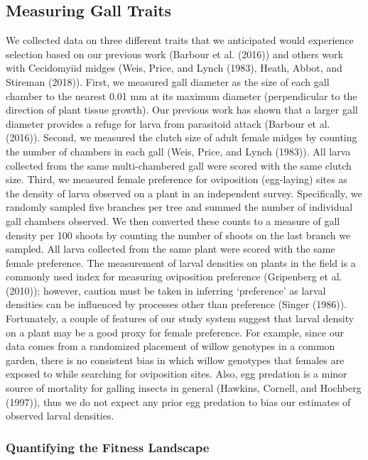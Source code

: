 \documentclass[]{elsarticle} %
\begin{document}
\subsection{Measuring Gall Traits}\label{measuring-gall-traits}

We collected data on three different traits that we anticipated would
experience selection based on our previous work (Barbour et al. (2016))
and others work with Cecidomyiid midges (Weis, Price, and Lynch (1983),
Heath, Abbot, and Stireman (2018)). First, we measured gall diameter as
the size of each gall chamber to the nearest 0.01 mm at its maximum
diameter (perpendicular to the direction of plant tissue growth). Our
previous work has shown that a larger gall diameter provides a refuge
for larva from parasitoid attack (Barbour et al. (2016)). Second, we
measured the clutch size of adult female midges by counting the number
of chambers in each gall (Weis, Price, and Lynch (1983)). All larva
collected from the same multi-chambered gall were scored with the same
clutch size. Third, we measured female preference for oviposition
(egg-laying) sites as the density of larva observed on a plant in an
independent survey. Specifically, we randomly sampled five branches per
tree and summed the number of individual gall chambers observed. We then
converted these counts to a measure of gall density per 100 shoots by
counting the number of shoots on the last branch we sampled. All larva
collected from the same plant were scored with the same female
preference. The measurement of larval densities on plants in the field
is a commonly used index for measuring oviposition preference
(Gripenberg et al. (2010)); however, caution must be taken in inferring
`preference' as larval densities can be influenced by processes other
than preference (Singer (1986)). Fortunately, a couple of features of
our study system suggest that larval density on a plant may be a good
proxy for female preference. For example, since our data comes from a
randomized placement of willow genotypes in a common garden, there is no
consistent bias in which willow genotypes that females are exposed to
while searching for oviposition sites. Also, egg predation is a minor
source of mortality for galling insects in general (Hawkins, Cornell,
and Hochberg (1997)), thus we do not expect any prior egg predation to
bias our estimates of observed larval densities.

\subsubsection{Quantifying the Fitness
Landscape}\label{quantifying-the-fitness-landscape}
\end{document}
